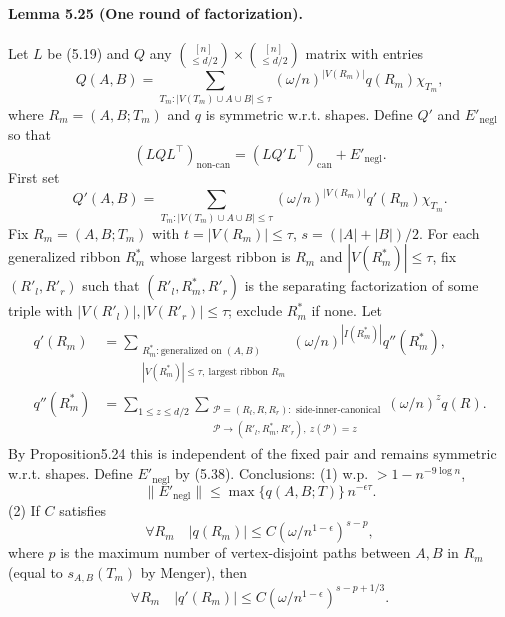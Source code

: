 \documentclass[10pt,a4paper]{article}
\begin{document}
\paragraph{Lemma 5.25 (One round of factorization).} Let $L$ be (5.19) and $Q$ any $\binom{[n]}{\le d/2}\times\binom{[n]}{\le d/2}$ matrix with entries
\[Q(A,B)=\sum_{T_m:|V(T_m)\cup A\cup B|\le\tau}(\omega/n)^{|V(R_m)|}q(R_m)\chi_{T_m},\tag{5.37}\]
where $R_m=(A,B;T_m)$ and $q$ is symmetric w.r.t. shapes. Define $Q'$ and $E'_{\mathrm{negl}}$ so that
\[(LQL^\top)_{\mathrm{non\text{-}can}}=(LQ'L^\top)_{\mathrm{can}}+E'_{\mathrm{negl}}.\tag{5.38}\]
First set
\[Q'(A,B)=\sum_{T_m:|V(T_m)\cup A\cup B|\le\tau}(\omega/n)^{|V(R_m)|}q'(R_m)\chi_{T_m}.\tag{5.39}\]
Fix $R_m=(A,B;T_m)$ with $t=|V(R_m)|\le\tau$, $s=(|A|+|B|)/2$. For each generalized ribbon $R^*_m$ whose largest ribbon is $R_m$ and $|V(R^*_m)|\le\tau$, fix $(R'_l,R'_r)$ such that $(R'_l,R^*_m,R'_r)$ is the separating factorization of some triple with $|V(R'_l)|,|V(R'_r)|\le\tau$; exclude $R^*_m$ if none. Let
\begin{align*}q'(R_m)&=\sum_{\substack{R^*_m:\text{generalized on }(A,B)\\|V(R^*_m)|\le\tau,\ \text{largest ribbon }R_m}}(\omega/n)^{|I(R^*_m)|}q''(R^*_m),\\q''(R^*_m)&=\sum_{1\le z\le d/2}\sum_{\substack{\mathcal P=(R_l,R,R_r):\text{ side-inner-canonical}\\\mathcal P\to(R'_l,R^*_m,R'_r),\ z(\mathcal P)=z}}(\omega/n)^zq(R).\tag{5.40}\end{align*}
By Proposition5.24 this is independent of the fixed pair and remains symmetric w.r.t. shapes. Define $E'_{\mathrm{negl}}$ by (5.38). Conclusions: (1) w.p. $>1-n^{-9\log n}$,
\[\|E'_{\mathrm{negl}}\|\le\max\{q(A,B;T)\}\,n^{-\epsilon\tau}.\]
(2) If $C$ satisfies
\[\forall R_m\quad|q(R_m)|\le C(\omega/n^{1-\epsilon})^{s-p},\tag{5.41}\]
where $p$ is the maximum number of vertex-disjoint paths between $A,B$ in $R_m$ (equal to $s_{A,B}(T_m)$ by Menger), then
\[\forall R_m\quad|q'(R_m)|\le C(\omega/n^{1-\epsilon})^{s-p+1/3}.\]
\end{document}
